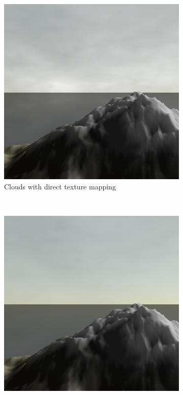 \documentclass{article}
\begin{document}
\begin{figure}[H]
\centering
    \begin{subfigure}[b]{0.45\textwidth}
        \centering
        \includegraphics[scale=0.25]{cloudPlain}
        \caption{Clouds with direct texture mapping}
        \label{fig:cloudPlain}
    \end{subfigure}
    ~
    \begin{subfigure}[b]{0.45\textwidth}
        \centering
        \includegraphics[scale=0.25]{cloudFog}

\end{subfigure}
\end{figure}
\end{document}
